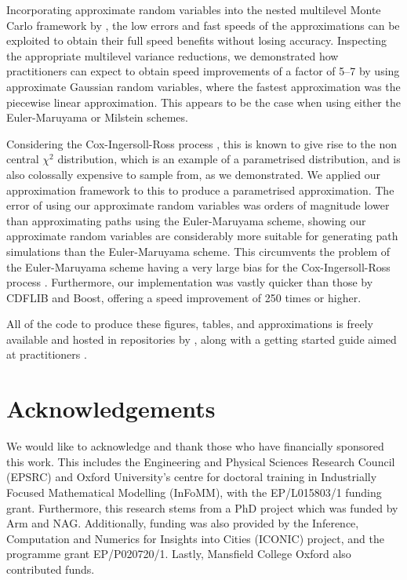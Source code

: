\documentclass[manuscript,review]{acmart}
\begin{document}
Incorporating approximate random variables into the nested multilevel Monte Carlo framework by \citet{giles2020approximate}, the low errors and fast speeds of the approximations can be exploited to obtain their full speed benefits without losing accuracy. Inspecting the appropriate multilevel variance reductions, we demonstrated how practitioners can expect to obtain speed improvements of a factor of 5--7 by using approximate Gaussian random variables, where the fastest approximation was the piecewise linear approximation. This appears to be the case when using either the Euler-Maruyama or Milstein schemes. 

Considering the Cox-Ingersoll-Ross process \citep{cox1985theory}, this is known to give rise to the non central $ \chi^2 $ distribution, which is an example of a parametrised distribution, and is also colossally expensive to sample from, as we demonstrated. We applied our approximation framework to this to produce a parametrised approximation. The error of using our approximate random variables was orders of magnitude lower than approximating paths using the Euler-Maruyama scheme, showing our approximate random variables are considerably more suitable for generating path simulations than the Euler-Maruyama scheme. This circumvents the problem of the Euler-Maruyama scheme having a very large bias for the Cox-Ingersoll-Ross process \citep{broadie2006exact}. Furthermore, our implementation was vastly quicker than those by CDFLIB and Boost, offering a speed improvement of 250 times or higher. 

All of the code to produce these figures, tables, and approximations is freely available and hosted in repositories by \citet{sheridan2020approximate_inverse,sheridan2020approximate_random}, along with a getting started guide aimed at practitioners \citep{sheridan2020approximate_random}.

\section{Acknowledgements}

We would like to acknowledge and thank those who have financially sponsored this work. This includes the Engineering and Physical Sciences Research Council (EPSRC) and Oxford University's centre for doctoral training in Industrially Focused Mathematical Modelling (InFoMM), with the EP/L015803/1 funding grant. Furthermore, this research stems from a PhD project \citep{sheridan2020nested} which was funded by Arm and NAG. Additionally, funding was also provided by the Inference, Computation and Numerics for Insights into Cities (ICONIC) project, and the programme grant EP/P020720/1. Lastly, Mansfield College Oxford also contributed funds.  



\end{document}
